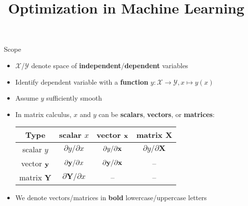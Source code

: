 \documentclass[11pt,compress,t,notes=noshow, xcolor=table]{beamer}
\title{Optimization in Machine Learning}
\date{}
\begin{document}
\sloppy



\begin{vbframe}{Scope}
\begin{itemize}
    \setlength{\itemsep}{0.5\baselineskip}
    \item $\mathcal{X}$/$\mathcal{Y}$ denote space of \textbf{independent}/\textbf{dependent} variables
    \item Identify dependent variable with a \textbf{function} $y: \mathcal{X} \to \mathcal{Y}, x\mapsto y(x)$
    \item Assume $y$ sufficiently smooth
    \item In matrix calculus, $x$ and $y$ can be \textbf{scalars}, \textbf{vectors}, or \textbf{matrices}:
        \vspace{0.5\baselineskip}
        \begin{table}
            \centering
            \begin{tabular}{c||c|c|c}
                 Type & scalar $x$ & vector $\mathbf{x}$ & matrix $\mathbf{X}$ \\ \hline\hline
                 scalar $y$ & $\partial y / \partial x$ & $\partial y / \partial\mathbf{x}$ & $\partial y / \partial\mathbf{X}$ \\ \hline
                 vector $\mathbf{y}$ & $\partial\mathbf{y} / \partial x$ & $\partial\mathbf{y} / \partial\mathbf{x}$ & -- \\ \hline
                 matrix $\mathbf{Y}$ & $\partial\mathbf{Y} / \partial x$ & -- & --
            \end{tabular}
        \end{table}
    \item We denote vectors/matrices in \textbf{bold} lowercase/uppercase letters
\end{itemize}
\end{vbframe}
\end{document}
